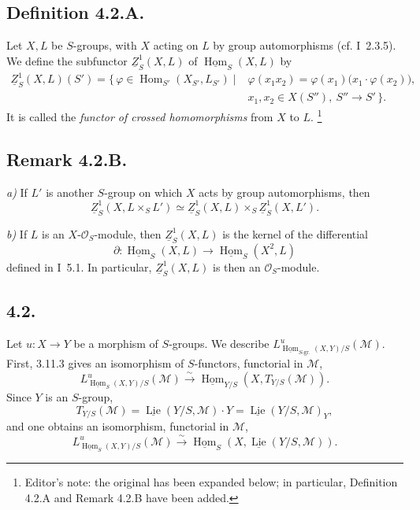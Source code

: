 \subsection*{Definition 4.2.A.}
Let \(X,L\) be \(S\)-groups, with \(X\) acting on \(L\) by group
automorphisms (cf. I~2.3.5). We define the subfunctor
\(\underline Z^1_S(X,L)\) of
\(\underline{\operatorname{Hom}}_S(X,L)\) by
\[
\begin{aligned}
 \underline Z^1_S(X,L)(S')
 =\{\,\varphi\in\operatorname{Hom}_{S'}(X_{S'},L_{S'})\mid{}
 &\varphi(x_1x_2)
   =\varphi(x_1)\bigl(x_1\cdot\varphi(x_2)\bigr),\\[-2pt]
 &x_1,x_2\in X(S''),\ S''\to S'\,\}.
\end{aligned}
\]
It is called the \emph{functor of crossed homomorphisms} from \(X\) to
\(L\).
\footnote{Editor's note: the original has been expanded below; in
particular, Definition 4.2.A and Remark 4.2.B have been added.}

\subsection*{Remark 4.2.B.}
\textit{a)} If \(L'\) is another \(S\)-group on which \(X\) acts by group
automorphisms, then
\[
 \underline Z^1_S(X,L\times_SL')
 \simeq \underline Z^1_S(X,L)\times_S\underline Z^1_S(X,L').
\]

\textit{b)} If \(L\) is an \(X\)-\(\mathcal O_S\)-module, then
\(\underline Z^1_S(X,L)\) is the kernel of the differential
\[
 \partial:\underline{\operatorname{Hom}}_S(X,L)
 \longrightarrow\underline{\operatorname{Hom}}_S(X^2,L)
\]
defined in I~5.1. In particular, \(\underline Z^1_S(X,L)\) is then an
\(\mathcal O_S\)-module.

\subsection*{4.2.}
Let \(u:X\to Y\) be a morphism of \(S\)-groups. We describe
\(L^u_{\underline{\operatorname{Hom}}_{S\text{-gr.}}(X,Y)/S}
(\mathcal M)\). First, 3.11.3 gives an isomorphism of \(S\)-functors,
functorial in \(\mathcal M\),
\begin{equation}
 L^u_{\underline{\operatorname{Hom}}_S(X,Y)/S}(\mathcal M)
 \xrightarrow{\sim}
 \underline{\operatorname{Hom}}_{Y/S}(X,T_{Y/S}(\mathcal M)).
 \tag{\(\dagger\)}
\end{equation}
Since \(Y\) is an \(S\)-group,
\[
 T_{Y/S}(\mathcal M)
 =\underline{\operatorname{Lie}}(Y/S,\mathcal M)\cdot Y
 =\underline{\operatorname{Lie}}(Y/S,\mathcal M)_Y,
\]
and one obtains an isomorphism, functorial in \(\mathcal M\),
\[
 L^u_{\underline{\operatorname{Hom}}_S(X,Y)/S}(\mathcal M)
 \xrightarrow{\sim}
 \underline{\operatorname{Hom}}_S
   (X,\underline{\operatorname{Lie}}(Y/S,\mathcal M)).
\]

